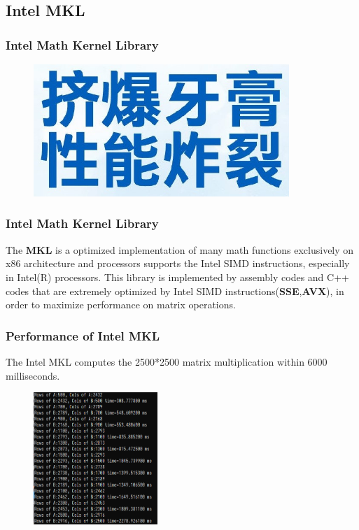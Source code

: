 \documentclass[cjk]{beamer}
\begin{document}
\subsection{Intel MKL}
\begin{frame}
  \frametitle{Intel Math Kernel Library}

  \begin{figure}[htb]
    \begin{center}
      \includegraphics[height=5.0cm]{yagao-logo.jpg}
    \end{center}
  \end{figure}

\end{frame}
\begin{frame}
  \frametitle{Intel Math Kernel Library}

  The \textbf{MKL} is a optimized implementation of many math functions exclusively on x86 architecture and processors supports the Intel SIMD instructions, especially in Intel(R) processors. This library is implemented by assembly codes and C++ codes that are extremely optimized by Intel SIMD instructions(\textbf{SSE},\textbf{AVX}), in order to maximize performance on matrix operations.

\end{frame}
\begin{frame}
  \frametitle{Performance of Intel MKL}
  The Intel MKL computes the 2500*2500 matrix multiplication within 6000 milliseconds.
  \begin{figure}[htb]
    \begin{center}
      \includegraphics[height=5.0cm]{mkl_dgemm.png}
    \end{center}
  \end{figure}

\end{frame}
\end{document}
